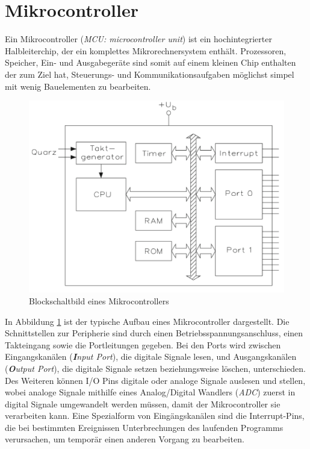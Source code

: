 \section{Mikrocontroller}
Ein Mikrocontroller (\textit{MCU: microcontroller unit}) ist ein hochintegrierter Halbleiterchip, der ein komplettes Mikrorechnersystem enthält. Prozessoren, Speicher, Ein- und Ausgabegeräte sind somit auf einem kleinen Chip enthalten der zum Ziel hat, Steuerungs- und Kommunikationsaufgaben möglichst simpel mit wenig Bauelementen zu bearbeiten. 
\begin{figure}[h]
	\centering
		\includegraphics{Bilder/BlockschaltbildMikrocontroller.pdf}
	\caption{Blockschaltbild eines Mikrocontrollers \cite[S.3]{Bernstein2015}}
	\label{fig:Blockschaltbild Mikrocontroller}
\end{figure} \noindent

In Abbildung \ref{fig:Blockschaltbild Mikrocontroller} ist der typische Aufbau eines Mikrocontroller dargestellt. Die Schnittstellen zur Peripherie sind durch einen Betriebsspannungsanschluss, einen Takteingang sowie die Portleitungen  gegeben. Bei den Ports wird zwischen Eingangskanälen (\textit{\textbf{I}nput Port}), die digitale Signale lesen, und Ausgangskanälen (\textit{\textbf{O}utput Port}), die digitale Signale setzen beziehungsweise löschen, unterschieden. Des Weiteren können I/O Pins digitale oder analoge Signale auslesen und stellen, wobei analoge Signale mithilfe eines Analog/Digital Wandlers (\textit{ADC}) zuerst in digital Signale umgewandelt werden müssen, damit der Mikrocontroller sie verarbeiten kann.
Eine Spezialform von Eingängskanälen sind die Interrupt-Pins, die bei bestimmten Ereignissen Unterbrechungen des laufenden Programms verursachen, um temporär einen anderen Vorgang zu bearbeiten. 

